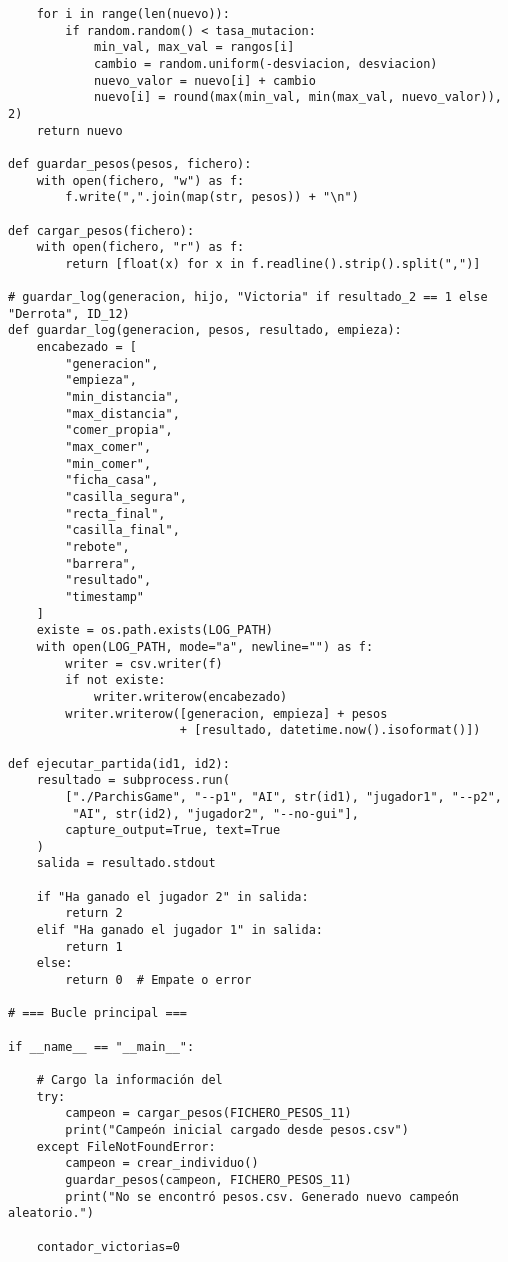\documentclass[12pt]{article}
\begin{document}
\begin{verbatim}
    for i in range(len(nuevo)):
        if random.random() < tasa_mutacion:
            min_val, max_val = rangos[i]
            cambio = random.uniform(-desviacion, desviacion)
            nuevo_valor = nuevo[i] + cambio
            nuevo[i] = round(max(min_val, min(max_val, nuevo_valor)), 2)
    return nuevo

def guardar_pesos(pesos, fichero):
    with open(fichero, "w") as f:
        f.write(",".join(map(str, pesos)) + "\n")

def cargar_pesos(fichero):
    with open(fichero, "r") as f:
        return [float(x) for x in f.readline().strip().split(",")]

# guardar_log(generacion, hijo, "Victoria" if resultado_2 == 1 else "Derrota", ID_12)
def guardar_log(generacion, pesos, resultado, empieza):
    encabezado = [
        "generacion",
        "empieza",
        "min_distancia",
        "max_distancia",
        "comer_propia",
        "max_comer",
        "min_comer",
        "ficha_casa",
        "casilla_segura",
        "recta_final",
        "casilla_final",
        "rebote",
        "barrera",
        "resultado",
        "timestamp"
    ]
    existe = os.path.exists(LOG_PATH)
    with open(LOG_PATH, mode="a", newline="") as f:
        writer = csv.writer(f)
        if not existe:
            writer.writerow(encabezado)
        writer.writerow([generacion, empieza] + pesos 
                        + [resultado, datetime.now().isoformat()])

def ejecutar_partida(id1, id2):
    resultado = subprocess.run(
        ["./ParchisGame", "--p1", "AI", str(id1), "jugador1", "--p2", 
         "AI", str(id2), "jugador2", "--no-gui"],
        capture_output=True, text=True
    )
    salida = resultado.stdout

    if "Ha ganado el jugador 2" in salida:
        return 2
    elif "Ha ganado el jugador 1" in salida:
        return 1
    else:
        return 0  # Empate o error

# === Bucle principal ===

if __name__ == "__main__":

    # Cargo la información del 
    try:
        campeon = cargar_pesos(FICHERO_PESOS_11)
        print("Campeón inicial cargado desde pesos.csv")
    except FileNotFoundError:
        campeon = crear_individuo()
        guardar_pesos(campeon, FICHERO_PESOS_11)
        print("No se encontró pesos.csv. Generado nuevo campeón aleatorio.")

    contador_victorias=0


\end{verbatim}
\end{document}
